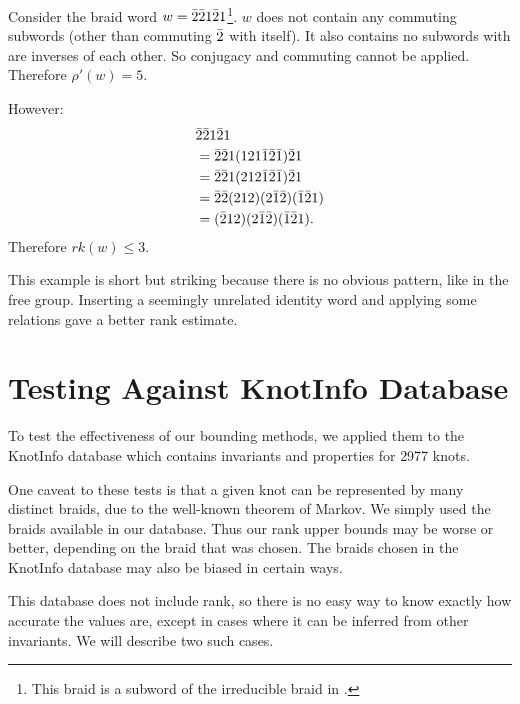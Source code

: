 \documentclass[12pt]{thesis}
\begin{document}
\begin{example}
    \label{ex:does-not-solve}
    Consider the braid word $w = \bar{2} \bar{2} 1 \bar{2} 1$\footnote{This braid is a subword of the irreducible braid in \cite{irreducible-braid}.}.
    $w$ does not contain any commuting subwords
    (other than commuting $\bar{2}$ with itself).
    It also contains no subwords with are inverses of each other.
    So conjugacy and commuting cannot be applied.
    Therefore $\rho'(w) = 5$.

    However:
    \[
        \begin{split}
            &\bar{2} \bar{2} 1 \bar{2} 1 \\
            &=\bar{2} \bar{2} 1 (1 2 1 \bar{1} \bar{2} \bar{1}) \bar{2} 1  \\
            &=\bar{2} \bar{2} 1 (2 1 2 \bar{1} \bar{2} \bar{1}) \bar{2} 1  \\
            &=\bar{2} \bar{2} (2 1 2) (2 \bar{1} \bar{2}) (\bar{1} \bar{2} 1)  \\
            &= (\bar{2} 1 2) (2 \bar{1} \bar{2}) (\bar{1} \bar{2} 1).  \\
        \end{split}
    \]  
    Therefore $rk(w) \leq 3$.
\end{example}

This example is short but striking because
there is no obvious pattern, like in the free group.
Inserting a seemingly unrelated identity word
and applying some relations gave a better rank estimate.

\section{Testing Against KnotInfo Database}
\begin{sloppypar}
To test the effectiveness of our bounding methods,
we applied them to the KnotInfo database \cite{knotinfo} which contains invariants and properties for 2977 knots.
\end{sloppypar}

One caveat to these tests is that a given knot can be represented by many distinct braids,
due to the well-known theorem of Markov.
We simply used the braids available in our database.
Thus our rank upper bounds may be worse or better, depending on the braid that was chosen.
The braids chosen in the KnotInfo database may also be biased in certain ways.

This database does not include rank,
so there is no easy way to know exactly how accurate the values are,
except in cases where it can be inferred from other invariants.
We will describe two such cases.
\end{document}
